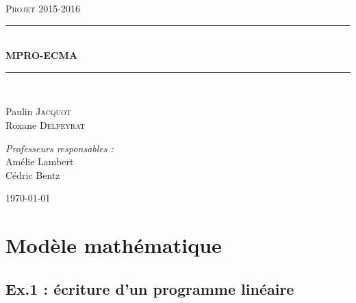 \documentclass[12pt,a4paper]{article}
\newcommand{\reporttitle}{\vspace{3mm} MPRO-ECMA}
\newcommand{\reportauthor}{Paulin \textsc{Jacquot}\\Roxane \textsc{Delpeyrat}}
\newcommand{\reportsubject}{Projet 2015-2016}
\newcommand{\HRule}{\rule{\linewidth}{0.5mm}}
\begin{document}
\begin{titlepage}
	\begin{center}
		\begin{minipage}[c]{0.50\textwidth}
			\begin{flushright}
			\end{flushright}
		\end{minipage}
		\hfill
		\begin{minipage}[c]{0.50\textwidth}
			\begin{flushleft}
			\end{flushleft}
		\end{minipage}
		
		\vspace{2cm}
		
		\textsc{\Large \reportsubject}\\[0.5cm]
		\HRule \\[0.4cm]
		{\huge \bfseries \reporttitle}\\[0.4cm]
		\HRule \\[1.5cm]
		\begin{minipage}[t]{0.6\textwidth}
			\begin{center} \large
				
					\reportauthor
					
					\vspace{3cm}
					
				\emph{Professeurs responsables :}\\
					Amélie Lambert \\
					Cédric Bentz
					
			\end{center}
		\end{minipage}
		\vfill
		{\large \today}
	\end{center}
\end{titlepage}

\newpage

\tableofcontents

\newpage

\section{Modèle mathématique}
\subsection{Ex.1 : écriture d'un programme linéaire}
\end{document}
